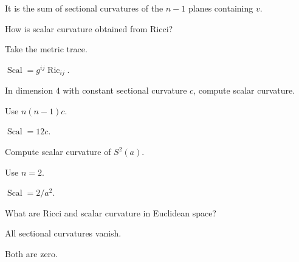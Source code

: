 \begin{solution}
It is the sum of sectional curvatures of the \(n-1\) planes containing \(v\).
\end{solution}

\begin{exercise}\label{exr:vii27-ped-02}
How is scalar curvature obtained from Ricci?
\end{exercise}

\begin{hint}
Take the metric trace.
\end{hint}

\begin{solution}
\(\operatorname{Scal}=g^{ij}\operatorname{Ric}_{ij}\).
\end{solution}

\begin{exercise}\label{exr:vii27-ped-03}
In dimension \(4\) with constant sectional curvature \(c\), compute scalar curvature.
\end{exercise}

\begin{hint}
Use \(n(n-1)c\).
\end{hint}

\begin{solution}
\(\operatorname{Scal}=12c\).
\end{solution}

\begin{exercise}\label{exr:vii27-ped-04}
Compute scalar curvature of \(S^2(a)\).
\end{exercise}

\begin{hint}
Use \(n=2\).
\end{hint}

\begin{solution}
\(\operatorname{Scal}=2/a^2\).
\end{solution}

\begin{exercise}\label{exr:vii27-ped-05}
What are Ricci and scalar curvature in Euclidean space?
\end{exercise}

\begin{hint}
All sectional curvatures vanish.
\end{hint}

\begin{solution}
Both are zero.
\end{solution}

